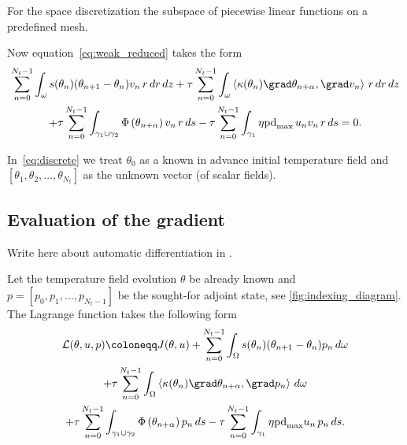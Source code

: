 For the space discretization the subspace of piecewise linear functions on a predefined mesh.

Now equation~\eqref{eq:weak_reduced} takes the form
\begin{multline} \label{eq:discrete}
	\sum_{n=0}^{N_t-1}\int_{\omega}
		s(\theta_n) (\theta_{n+1}-\theta_n) v_n\, r\, dr\, dz
	+ \tau
	\sum_{n=0}^{N_t-1}\int_{\omega}
		\left\langle \kappa(\theta_n) \grad \theta_{n+\alpha} , \grad v_n \right\rangle\, r\, dr \, dz \\
	+ \tau
	\sum_{n=0}^{N_t-1}\int_{\gamma_1 \cup \gamma_2}
		\Phi \left( \theta_{n+\alpha} \right)  v_n\, r\, ds
	- \tau
	\sum_{n=0}^{N_t-1}\int_{\gamma_1}
		\eta \text{pd}_{\max}\, u_n v_n\, r\, ds = 0.
\end{multline}

In~\eqref{eq:discrete} we treat $\theta_0$ as a known in advance initial temperature field and $[\theta_1, \theta_2, \ldots, \theta_{N_t}]$ as the unknown vector (of scalar fields).



\subsection{Evaluation of the gradient}

{\color{TolHighContrastBlue}
Write here about automatic differentiation in \fenics.
}

Let the temperature field evolution $\theta$ be already known and $p=[p_0, p_1, \ldots, p_{N_t-1}]$ be the sought-for adjoint state, see \cref{fig:indexing_diagram}.
The Lagrange function takes the following form
\begin{multline}
	\mathcal{L}(\theta,u,p) \coloneqq
	J(\theta,u)
	+
	\sum_{n=0}^{N_t-1}\int_{\Omega}
		s(\theta_n) (\theta_{n+1}-\theta_n) p_n\, d\omega \\
	+ \tau
	\sum_{n=0}^{N_t-1}\int_{\Omega}
		\left\langle \kappa(\theta_n) \grad \theta_{n+\alpha}, \grad p_n \right\rangle\, d\omega \\
	+ \tau
	\sum_{n=0}^{N_t-1}\int_{\gamma_1 \cup \gamma_2}
		\Phi \left( \theta_{n+\alpha} \right) p_n\, ds
	- \tau
	\sum_{n=0}^{N_t-1}\int_{\gamma_1}
		\eta \text{pd}_{\max} u_n\, p_n\, ds.
\end{multline}

